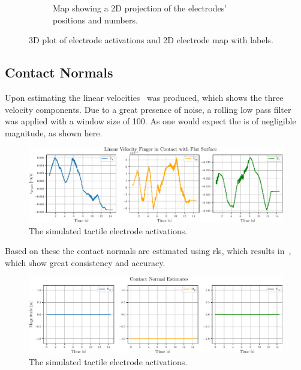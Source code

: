 \begin{figure}[h]
\begin{subfigure}[b]{0.48\textwidth}
		\caption{Map showing a 2D projection of the electrodes' positions and numbers.}
		\label{fig:electrode-map}
	\end{subfigure}
		\caption{3D plot of electrode activations and 2D electrode map with labels.}
		\label{fig:flat-contact-experimental-and-electrode-map}
\end{figure}

\subsection{Contact Normals} \label{sec:1-tactile-perception-results-contact-normals}

Upon estimating the linear velocities~ was produced, which shows the three velocity components. Due to a great presence of noise, a rolling low pass filter was applied with a window size of \num{100}. As one would expect the  is of negligible magnitude, as shown here. \medskip

\begin{figure}[!h]
	\begin{center}
		\includegraphics[width=\textwidth]{chapters/1-tactile-perception/fig/matplotlib/linear-velocity-finger-in-contact-with-flat-surface.pdf}
	\end{center}
	\caption{The simulated tactile electrode activations.}
	\label{fig:linear-velocity-finger-in-contact-with-flat-surface}
\end{figure}

Based on these the contact normals are estimated using \gls{rls}, which results in~, which show great consistency and accuracy.

\begin{figure}[!h]
	\begin{center}
		\includegraphics[width=\textwidth]{chapters/1-tactile-perception/fig/matplotlib/contact-normal-estimates.pdf}
	\end{center}
	\caption{The simulated tactile electrode activations.}
	\label{fig:contact-normal-estimates}
\end{figure}

